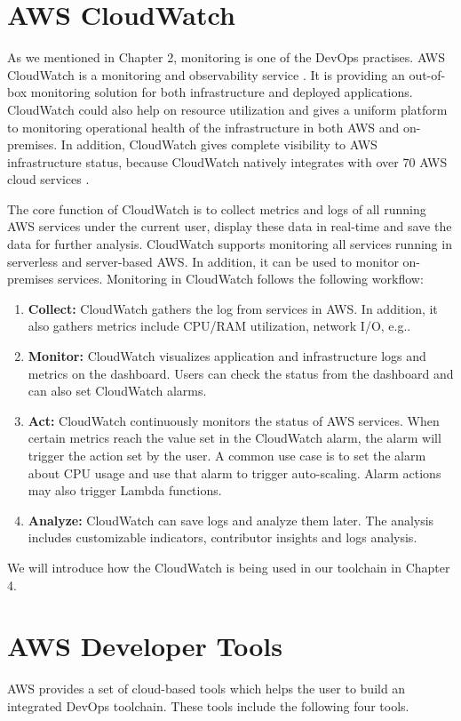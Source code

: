 \section{AWS CloudWatch}
As we mentioned in Chapter 2, monitoring is one of the DevOps practises. AWS CloudWatch is a monitoring and observability service \cite{AmazonCl65:online}. It is providing an out-of-box monitoring solution for both infrastructure and deployed applications. CloudWatch could also help on resource utilization and gives a uniform platform to monitoring operational health of the infrastructure in both AWS and on-premises. In addition, CloudWatch gives complete visibility to AWS infrastructure status, because CloudWatch natively integrates with over 70 AWS cloud services \cite{AmazonCl65:online}.
\par
The core function of CloudWatch is to collect metrics and logs of all running AWS services under the current user, display these data in real-time and save the data for further analysis.
CloudWatch supports monitoring all services running in serverless and server-based AWS. In addition, it can be used to monitor on-premises services. Monitoring in CloudWatch follows the following workflow:
\begin{enumerate}
    \item \textbf{Collect:} CloudWatch gathers the log from services in AWS. In addition, it also gathers metrics include CPU/RAM utilization, network I/O, e.g..
    \item \textbf{Monitor:} CloudWatch visualizes application and infrastructure logs and metrics on the dashboard. Users can check the status from the dashboard and can also set CloudWatch alarms.
    \item \textbf{Act:} CloudWatch continuously monitors the status of AWS services.
    When certain metrics reach the value set in the CloudWatch alarm, the alarm will trigger the action set by the user. A common use case is to set the alarm about CPU usage and use that alarm to trigger auto-scaling. Alarm actions may also trigger Lambda functions.
    \item \textbf{Analyze:} CloudWatch can save logs and analyze them later. The analysis includes customizable indicators, contributor insights and logs analysis.
\end{enumerate}
We will introduce how the CloudWatch is being used in our toolchain in Chapter 4.
\section{AWS Developer Tools}
AWS provides a set of cloud-based tools which helps the user to build an integrated DevOps toolchain. These tools include the following four tools.
